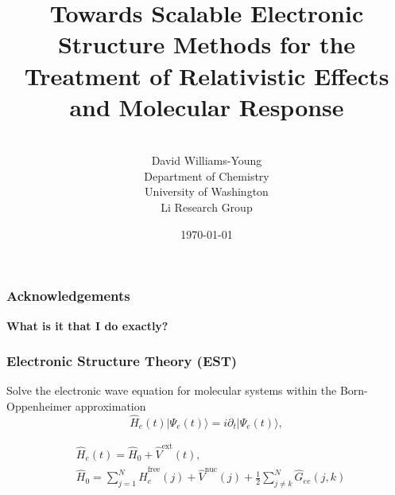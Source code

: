 \documentclass[usepdftitle=false]{beamer}
\title[]{Towards Scalable Electronic Structure Methods for the Treatment
  of Relativistic Effects and Molecular Response}
\author[]{
\\[2\baselineskip]
David Williams-Young \\
Department of Chemistry\\
University of Washington\\
Li Research Group
}
\date{\today}
\newcommand{\op}[1]{\hat{#1}}
\newcommand{\ket}[1]{\vert #1 \rangle}         %
\begin{document}
\begin{frame}
  \titlepage
\end{frame}





\begin{frame}

  \frametitle{Acknowledgements}


\end{frame}





\begin{frame}

  \begin{center} 
    \LARGE \bf What is it that I do exactly?
  \end{center}

\end{frame}

\begin{frame}

  \frametitle{Electronic Structure Theory (EST)}

  Solve the electronic wave equation for molecular systems within
  the Born-Oppenheimer approximation
  \begin{equation*}
    \op H_e(t) \ket{\Psi_e (t)} = i\partial_t \ket{\Psi_e (t)},
  \end{equation*}

  \begin{align*}
    &\op H_e(t) = \op H_0 + \op V^\mathrm{ext}(t),\\
    &\op H_0 = \sum_{j=1}^{N} 
        \op H_e^\mathrm{free}(j) + \op V^\mathrm{nuc}(j)  + 
	\frac{1}{2} \sum_{j \neq k}^N \op G_{ee}(j,k)
  \end{align*}


  

\end{frame}
\end{document}
